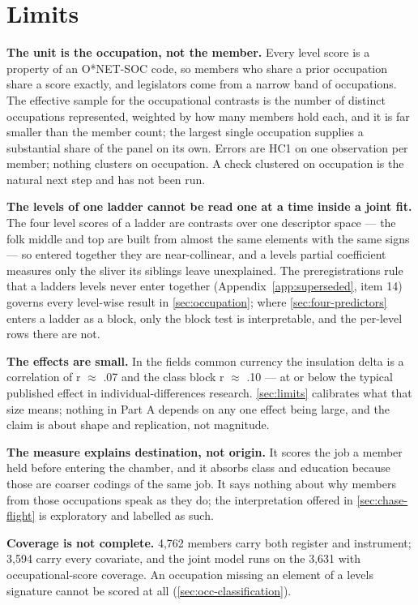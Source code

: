 \section{Limits}\label{sec:a-limits}

\textbf{The unit is the occupation, not the member.} Every level score is a
property of an O*NET-SOC code, so members who share a prior occupation share
a score exactly, and legislators come from a narrow band of occupations. The
effective sample for the occupational contrasts is the number of distinct
occupations represented, weighted by how many members hold each, and it is far
smaller than the member count; the largest single occupation supplies a
substantial share of the panel on its own. Errors are HC1 on one observation
per member; nothing clusters on occupation. A check clustered on occupation is
the natural next step and has not been run.

\textbf{The levels of one ladder cannot be read one at a time inside a joint fit.}
The four level scores of a ladder are contrasts over one descriptor space ---
the folk middle and top are built from almost the same elements with the same
signs --- so entered together they are near-collinear, and a level\textquotesingle s partial
coefficient measures only the sliver its siblings leave unexplained. The
preregistration\textquotesingle s rule that a ladder\textquotesingle s levels never enter together (Appendix~\ref{app:superseded}, item 14) governs every level-wise result in \cref{sec:occupation}; where \cref{sec:four-predictors} enters a
ladder as a block, only the block test is interpretable, and the per-level
rows there are not.

\textbf{The effects are small.} In the field\textquotesingle s common currency the insulation
delta is a correlation of r \(\approx\) .07 and the class block r \(\approx\) .10 --- at or below
the typical published effect in individual-differences research. \cref{sec:limits}
calibrates what that size means; nothing in Part A depends on any one effect
being large, and the claim is about shape and replication, not magnitude.

\textbf{The measure explains destination, not origin.} It scores the job a member
held before entering the chamber, and it absorbs class and education because
those are coarser codings of the same job. It says nothing about why members
from those occupations speak as they do; the interpretation offered in \cref{sec:chase-flight}
is exploratory and labelled as such.

\textbf{Coverage is not complete.} 4,762 members carry both register and
instrument; 3,594 carry every covariate, and the joint model runs on the 3,631
with occupational-score coverage. An occupation missing an element of a level\textquotesingle s signature
cannot be scored at all (\cref{sec:occ-classification}).

